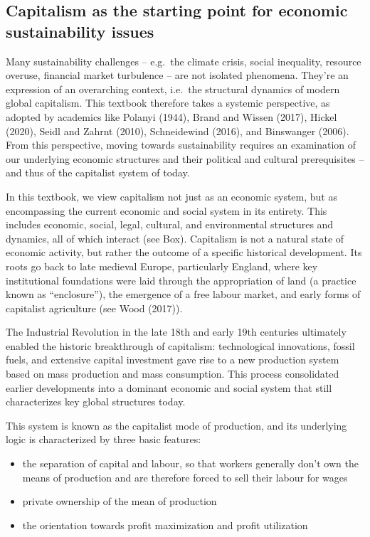 \documentclass[
  a4paper,
  openany]{book}
\begin{document}
\subsection{Capitalism as the starting point for economic sustainability
issues}\label{capitalism-as-the-starting-point-for-economic-sustainability-issues}

Many sustainability challenges -- e.g.~the climate crisis, social
inequality, resource overuse, financial market turbulence -- are not
isolated phenomena. They're an expression of an overarching context,
i.e.~the structural dynamics of modern global capitalism. This textbook
therefore takes a systemic perspective, as adopted by academics like
Polanyi (1944), Brand and Wissen (2017), Hickel (2020), Seidl and Zahrnt
(2010), Schneidewind (2016), and Binswanger (2006). From this
perspective, moving towards sustainability requires an examination of
our underlying economic structures and their political and cultural
prerequisites -- and thus of the capitalist system of today.

In this textbook, we view capitalism not just as an economic system, but
as encompassing the current economic and social system in its entirety.
This includes economic, social, legal, cultural, and environmental
structures and dynamics, all of which interact (see Box). Capitalism is
not a natural state of economic activity, but rather the outcome of a
specific historical development. Its roots go back to late medieval
Europe, particularly England, where key institutional foundations were
laid through the appropriation of land (a practice known as
``enclosure''), the emergence of a free labour market, and early forms
of capitalist agriculture (see Wood (2017)).

The Industrial Revolution in the late 18th and early 19th centuries
ultimately enabled the historic breakthrough of capitalism:
technological innovations, fossil fuels, and extensive capital
investment gave rise to a new production system based on mass production
and mass consumption. This process consolidated earlier developments
into a dominant economic and social system that still characterizes key
global structures today.

This system is known as the capitalist mode of production, and its
underlying logic is characterized by three basic features:

\begin{itemize}
\item
  the separation of capital and labour, so that workers generally don't
  own the means of production and are therefore forced to sell their
  labour for wages
\item
  private ownership of the mean of production
\item
  the orientation towards profit maximization and profit utilization
\end{itemize}
\end{document}
